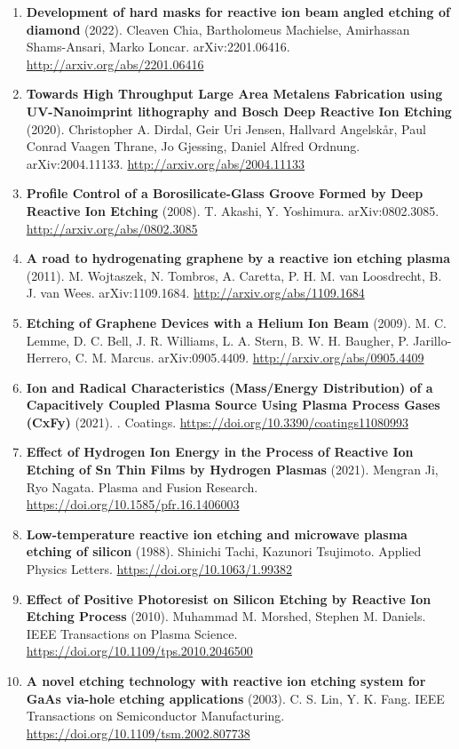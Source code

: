\documentclass[11pt,a4paper]{article}
\begin{document}
\begin{enumerate}[leftmargin=1.4em]
\item \textbf{Development of hard masks for reactive ion beam angled etching of diamond} (2022). Cleaven Chia, Bartholomeus Machielse, Amirhassan Shams-Ansari, Marko Loncar. arXiv:2201.06416. \url{http://arxiv.org/abs/2201.06416}
\item \textbf{Towards High Throughput Large Area Metalens Fabrication using UV-Nanoimprint lithography and Bosch Deep Reactive Ion Etching} (2020). Christopher A. Dirdal, Geir Uri Jensen, Hallvard Angelskår, Paul Conrad Vaagen Thrane, Jo Gjessing, Daniel Alfred Ordnung. arXiv:2004.11133. \url{http://arxiv.org/abs/2004.11133}
\item \textbf{Profile Control of a Borosilicate-Glass Groove Formed by Deep Reactive Ion Etching} (2008). T. Akashi, Y. Yoshimura. arXiv:0802.3085. \url{http://arxiv.org/abs/0802.3085}
\item \textbf{A road to hydrogenating graphene by a reactive ion etching plasma} (2011). M. Wojtaszek, N. Tombros, A. Caretta, P. H. M. van Loosdrecht, B. J. van Wees. arXiv:1109.1684. \url{http://arxiv.org/abs/1109.1684}
\item \textbf{Etching of Graphene Devices with a Helium Ion Beam} (2009). M. C. Lemme, D. C. Bell, J. R. Williams, L. A. Stern, B. W. H. Baugher, P. Jarillo-Herrero, C. M. Marcus. arXiv:0905.4409. \url{http://arxiv.org/abs/0905.4409}
\item \textbf{Ion and Radical Characteristics (Mass/Energy Distribution) of a Capacitively Coupled Plasma Source Using Plasma Process Gases (CxFy)} (2021). . Coatings. \url{https://doi.org/10.3390/coatings11080993}
\item \textbf{Effect of Hydrogen Ion Energy in the Process of Reactive Ion Etching of Sn Thin Films by Hydrogen Plasmas} (2021). Mengran Ji, Ryo Nagata. Plasma and Fusion Research. \url{https://doi.org/10.1585/pfr.16.1406003}
\item \textbf{Low-temperature reactive ion etching and microwave plasma etching of silicon} (1988). Shinichi Tachi, Kazunori Tsujimoto. Applied Physics Letters. \url{https://doi.org/10.1063/1.99382}
\item \textbf{Effect of Positive Photoresist on Silicon Etching by Reactive Ion Etching Process} (2010). Muhammad M. Morshed, Stephen M. Daniels. IEEE Transactions on Plasma Science. \url{https://doi.org/10.1109/tps.2010.2046500}
\item \textbf{A novel etching technology with reactive ion etching system for GaAs via-hole etching applications} (2003). C. S. Lin, Y. K. Fang. IEEE Transactions on Semiconductor Manufacturing. \url{https://doi.org/10.1109/tsm.2002.807738}

\end{enumerate}
\end{document}

